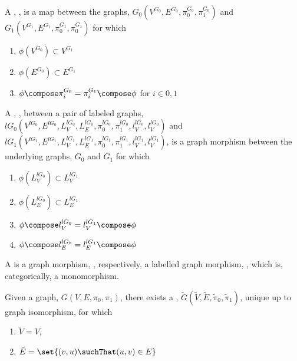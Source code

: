 \begin{definition}
A , , is a map between the graphs,
$G_0(V^{G_0}, E^{G_0}, \pi^{G_0}_0, \pi^{G_0}_1)$ and $G_1(V^{G_1}, E^{G_1}, \pi^{G_1}_0,
\pi^{G_1}_0)$ for which
\begin{enumerate}
\item $\phi(V^{G_0}) \subset V^{G_1}$
\item $\phi(E^{G_0}) \subset E^{G_1}$
\item $\phi \compose \pi^{G_0}_i = \pi^{G_1}_i \compose \phi$ for $i \in {0, 1}$
\end{enumerate}

A , , between a pair of labeled
graphs, $lG_0(V^{lG_0}, E^{lG_0}, L^{lG_0}_V, L^{lG_0}_E, \pi^{lG_0}_0, \pi^{lG_0}_1,
l^{lG_0}_V, l^{lG_0}_V)$ and $lG_1(V^{lG_1}, E^{lG_1}, L^{lG_1}_V, L^{lG_1}_E,
\pi^{lG_1}_0, \pi^{lG_1}_1, l^{lG_1}_V, l^{lG_1}_V)$, is a graph morphism between the
underlying graphs, $G_0$ and $G_1$ for which
\begin{enumerate}
\item $\phi(L^{lG_0}_V) \subset L^{lG_1}_V$
\item $\phi(L^{lG_0}_E) \subset L^{lG_1}_E$
\item $\phi \compose l^{lG_0}_V = l^{lG_1}_V \compose \phi$
\item $\phi \compose l^{lG_0}_E = l^{lG_1}_E \compose \phi$
\end{enumerate}
\end{definition}

\begin{definition} 
A  is a graph morphism, , respectively, a
labelled graph morphism, , which is, categorically, a monomorphism.
\end{definition}

\begin{lemma}
Given a graph, $G(V, E, \pi_0, \pi_1)$, there exists a ,
$\tilde{G}(\tilde{V}, \tilde{E}, \tilde{\pi}_0, \tilde{\pi}_1)$, unique up to graph 
isomorphism, for which
\begin{enumerate}
\item $\tilde{V} = V$,
\item $\tilde{E} = \set{(v, u) \suchThat (u, v) \in E}$
\end{enumerate}
\end{lemma}

